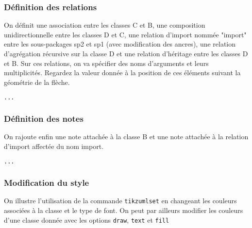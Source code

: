 \documentclass[a4paper,11pt]{report}
\newcommand{\inputTikZ}[1]{%
  }%
\newcommand{\inputTikZ}[1]{%
    \texttt{[image: fig/\#1.pdf]}%
  }%
\begin{document}
\begin{center}
\inputTikZ{classdiagstep2}
\end{center}


\subsubsection{Définition des relations}

On définit une association entre les classes C et B, une composition unidirectionnelle entre les classes D et C, une relation d'import nommée "import" entre les sous-packages sp2 et sp1 (avec modification des ancres), une relation d'agrégation récursive sur la classe D et une relation d'héritage entre les classes D et B. Sur ces relations, on va spécifier des noms d'arguments et leurs multiplicités. Regardez la valeur donnée à la position de ces éléments suivant la géométrie de la flèche.

\medskip

\hspace{-0.7cm}\lstinline{...}
{\color{red!70!black}

}

\begin{center}
\inputTikZ{classdiagstep3}
\end{center}

\subsubsection{Définition des notes}

On rajoute enfin une note attachée à la classe B et une note attachée à la relation d'import affectée du nom import.

\medskip

\hspace{-0.7cm}\lstinline{...}
{\color{red!70!black}

}

\begin{center}
\inputTikZ{classdiagstep4}
\end{center}

\subsubsection{Modification du style}

On illustre l'utilisation de la commande {\tt tikzumlset} en changeant les couleurs associées à la classe et le type de font. On peut par ailleurs modifier les couleurs d'une classe donnée avec les options {\tt draw}, {\tt text} et {\tt fill}
\end{document}
